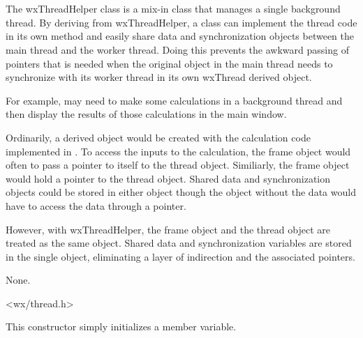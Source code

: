 \section{}\label{wxthreadhelper}

The wxThreadHelper class is a mix-in class that manages a single background
thread.  By deriving from wxThreadHelper, a class can implement the thread
code in its own  method
and easily share data and synchronization objects between the main thread
and the worker thread.  Doing this prevents the awkward passing of pointers
that is needed when the original object in the main thread needs to
synchronize with its worker thread in its own wxThread derived object.

For example,  may need to make some calculations
in a background thread and then display the results of those calculations in
the main window.

Ordinarily, a  derived object would be created
with the calculation code implemented in
.  To access the inputs to the
calculation, the frame object would often to pass a pointer to itself to the
thread object.  Similiarly, the frame object would hold a pointer to the
thread object.  Shared data and synchronization objects could be stored in
either object though the object without the data would have to access the
data through a pointer.

However, with wxThreadHelper, the frame object and the thread object are
treated as the same object.  Shared data and synchronization variables are
stored in the single object, eliminating a layer of indirection and the
associated pointers.


None.


<wx/thread.h>




\label{wxthreadhelperctor}


This constructor simply initializes a member variable.

\label{wxthreadhelpermthread}

